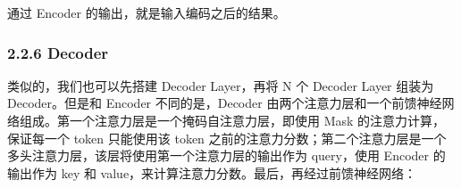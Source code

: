\documentclass[12pt,a4paper]{book}
\begin{document}
\begin{Shaded}
\begin{Highlighting}[]
     \NormalTok{(}
        \NormalTok{() }
        \OperatorTok{=}\NormalTok{ nn.ModuleList([EncoderLayer(args) }\NormalTok{ \_ } \NormalTok{(args.n\_layer)])}
        \OperatorTok{=}

         
\OperatorTok{=}
         
\end{Highlighting}
\end{Shaded}

通过 Encoder 的输出，就是输入编码之后的结果。

\subsubsection{2.2.6 Decoder}\label{decoder}

类似的，我们也可以先搭建 Decoder Layer，再将 N 个 Decoder Layer 组装为
Decoder。但是和 Encoder 不同的是，Decoder
由两个注意力层和一个前馈神经网络组成。第一个注意力层是一个掩码自注意力层，即使用
Mask 的注意力计算，保证每一个 token 只能使用该 token
之前的注意力分数；第二个注意力层是一个多头注意力层，该层将使用第一个注意力层的输出作为
query，使用 Encoder 的输出作为 key 和
value，来计算注意力分数。最后，再经过前馈神经网络：
\end{document}
